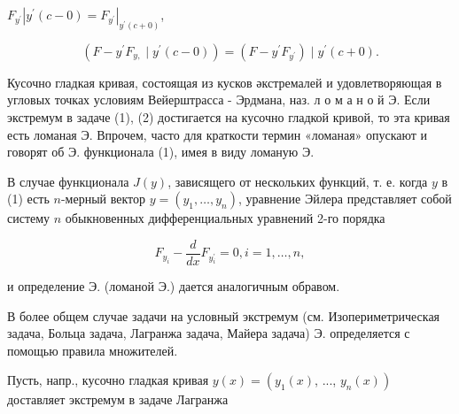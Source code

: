 \documentclass[10pt]{article}
\begin{document}
$F_{y^{\prime}}\left|y^{\prime}(c-0)=F_{y^{\prime}}\right|_{y^{\prime}(c+0)}$,



\[

\left(F-y^{\prime} F_{y,} \mid y^{\prime}(c-0)\right)=\left(F-y^{\prime} F_{y^{\prime}}\right) \mid y^{\prime}(c+0) .

\]



Кусочно гладкая кривая, состоящая из кусков әкстремалей и удовлетворяющая в угловых точках условиям Вейерштрасса - Эрдмана, наз. л о м а н о й Э. Если экстремум в задаче (1), (2) достигается на кусочно гладкой кривой, то эта кривая есть ломаная Э. Впрочем, часто для краткости термин «ломаная» опускают и говорят об Э. функционала (1), имея в виду ломаную Э.



В случае функционала $J(y)$, зависящего от нескольких функций, т. е. когда $y$ в (1) есть $n$-мерный вектор $y=\left(y_{1}, \ldots, y_{n}\right)$, уравнение Эйлера представляет собой систему $n$ обыкновенных дифференциальных уравнений 2-го порядка



\[

F_{y_{i}}-\frac{d}{d x} F_{y_{i}^{\prime}}=0, i=1, \ldots, n,

\]



и определение Э. (ломаной Э.) дается аналогичным обравом.



В более общем случае задачи на условный экстремум (см. Изопериметрическая задача, Больца задача, Лагранжа задача, Майера задача) Э. определяется с помощью правила множителей.



Пусть, напр., кусочно гладкая кривая $y(x)=\left(y_{1}(x)\right.$, ..., $\left.y_{n}(x)\right)$ доставляет экстремум в задаче Лагранжа
\end{document}
